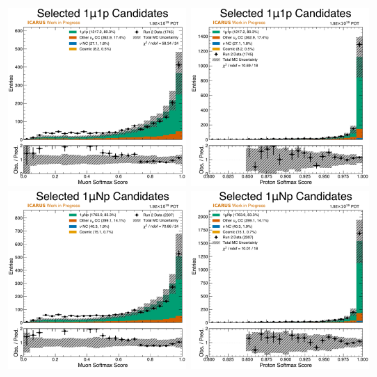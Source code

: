 \begin{figure}[!htb]
    \centering
    \includegraphics[width=0.42\textwidth]{figures/data_mc_comparisons/datamc_hist1d_1mu1p_muon_softmax.pdf}
    \includegraphics[width=0.42\textwidth]{figures/data_mc_comparisons/datamc_hist1d_1mu1p_proton_softmax.pdf}
    \\
    \includegraphics[width=0.42\textwidth]{figures/data_mc_comparisons/datamc_hist1d_1muNp_muon_softmax.pdf}
    \includegraphics[width=0.42\textwidth]{figures/data_mc_comparisons/datamc_hist1d_1muNp_proton_softmax.pdf}

\end{figure}

